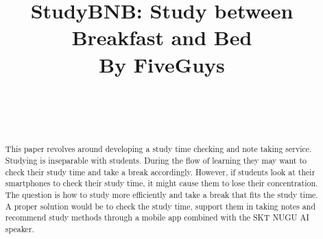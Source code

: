 \documentclass[conference]{IEEEtran}
\begin{document}
\title{StudyBNB: Study between Breakfast and Bed\\
{\LARGE By FiveGuys}
}

\author{
\\[2ex]
\and
{}
\and
{}
\\[2ex]
}

\maketitle

\begin{abstract}
This paper revolves around developing a study time checking and note taking service. Studying is inseparable with students. During the flow of learning they may want to check their study time and take a break accordingly. However, if students look at their smartphones to check their study time, it might cause them to lose their concentration. The question is how to study more efficiently and take a break that fits the study time. A proper solution would be to check the study time, support them in taking notes and recommend study methods through a mobile app combined with the SKT NUGU AI speaker.
\end{abstract}
\end{document}
